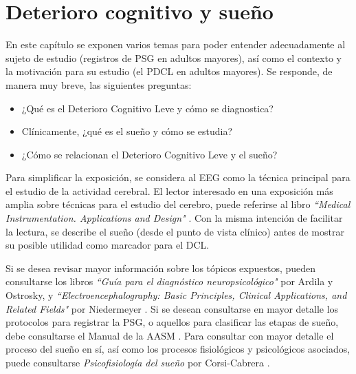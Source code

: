 
\chapter{Deterioro cognitivo y sueño}

En este capítulo se exponen varios temas para poder entender adecuadamente al sujeto de estudio (registros de PSG en adultos mayores), así como el contexto y la motivación para su estudio (el PDCL en adultos mayores).
%
Se responde, de manera muy breve, las siguientes preguntas:
\begin{itemize}
\item ¿Qué es el Deterioro Cognitivo Leve y cómo se diagnostica?
\item Clínicamente, ¿qué es el sueño y cómo se estudia?
\item ¿Cómo se relacionan el Deterioro Cognitivo Leve y el sueño?
\end{itemize}

Para simplificar la exposición, se considera al EEG como la técnica principal para el estudio de la actividad cerebral.
%
El lector interesado en una exposición más amplia sobre técnicas para el estudio del cerebro, puede referirse al libro \textit{``Medical Instrumentation. Applications and Design"} \cite{Webster}.
%
Con la misma intención de facilitar la lectura, se describe el sueño (desde el punto de vista clínico) antes de mostrar su posible utilidad como marcador para el DCL.

Si se desea revisar mayor información sobre los tópicos expuestos, pueden consultarse los libros \textit{``Guía para el diagnóstico neuropsicológico"} \cite{Ardila12} por Ardila y Ostrosky, y \textit{``Electroencephalography: Basic Principles, Clinical Applications, and Related Fields"} por Niedermeyer \cite{niedermeyer}.
%
Si se desean consultarse en mayor detalle los protocolos para registrar la PSG, o aquellos para clasificar las etapas de sueño, debe consultarse el Manual de la AASM \cite{AASM07}.
%
Para consultar con mayor detalle el proceso del sueño en sí, así como los procesos fisiológicos y psicológicos asociados, puede consultarse \textit{Psicofisiología del sueño} por Corsi-Cabrera \cite{Corsi1983}.


